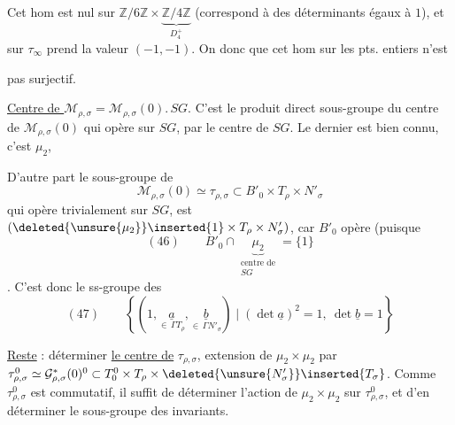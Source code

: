 Cet hom est nul sur $\mathbb Z/6\mathbb Z\times\underbrace{\mathbb Z/4\mathbb Z}_{D_4^+}$  (correspond à des déterminants égaux à $1$), et sur $\tau_\infty$ prend la valeur $(-1,-1)$. On  donc que cet hom sur les pts. entiers n'est


pas surjectif.

\uline{Centre de $\mathcal M_{\rho,\sigma}$}$=\mathcal M_{\rho,\sigma}(0).\,SG$. C'est le produit direct  sous-groupe du centre de $\mathcal M_{\rho,\sigma}(0)$ qui opère  sur $SG$, par le  centre de $SG$. Le dernier  est bien connu, c'est $\mu_2$,  


D'autre part le sous-groupe de
\[
\mathcal M_{\rho,\sigma}(0)\simeq\tau_{\rho,\sigma}\subset B'_0\times T_\rho\times N'_\sigma
\]
qui opère trivialement sur $SG$, est  $(\deleted{\unsure{\mu_2}}\inserted{1}\times T_\rho\times N'_\sigma)$, car $B'_0$ opère   (puisque
\[
(46)\qquad B'_0\cap\underbrace{\mu_2}_{\substack{\text{centre de}\\SG}}=\{1\}
\]
. C'est donc le ss-groupe des
\[
(47)\qquad
\left\{\left(1,\underset{\in\,\Gamma T_\rho}{\underline a},\underset{\in\,\Gamma N'_\sigma}{\underline b}\right)\mid(\det\underline a)^2=1,\ \det\underline b=1\right\}
\]

\uline{Reste} : déterminer \uline{le centre de} $\tau_{\rho,\sigma}$, extension de $\mu_2\times\mu_2$ par $\tau^0_{\rho,\sigma}\simeq\mathcal G^*_{\rho,\sigma}(0)^0\subset T_0^0\times T_\rho\times\deleted{\unsure{N'_\sigma}}\inserted{T_\sigma}$. Comme $\tau^0_{\rho,\sigma}$ est commutatif, il suffit de déterminer l'action de $\mu_2\times\mu_2$ sur $\tau^0_{\rho,\sigma}$, et d'en déterminer le sous-groupe des invariants.

